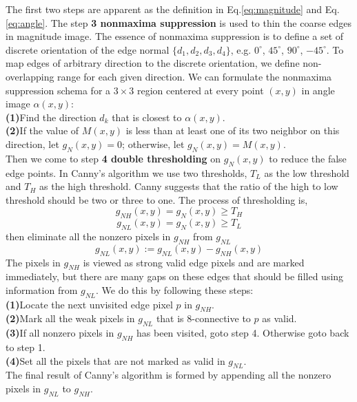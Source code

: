 The first two steps are apparent as the definition in Eq.\ref{eq:magnitude} and Eq.\ref{eq:angle}. The step \textbf{3 nonmaxima suppression} is used to thin the coarse edges in magnitude image. The essence of nonmaxima suppression is to define a set of discrete orientation of the edge normal $\{ d_1, d_2, d_3, d_4 \}$, e.g. $0^\circ$, $45^\circ$, $90^\circ$, $-45^\circ$. To map edges of arbitrary direction to the discrete orientation, we define non-overlapping range for each given direction. We can formulate the nonmaxima suppression schema for a $3\times 3$ region centered at every point $(x,y)$ in angle image $\alpha(x,y)$: \\
\textbf{(1)}Find the direction $d_k$ that is closest to $\alpha(x,y)$. \\
\textbf{(2)}If the value of $M(x,y)$ is less than at least one of its two neighbor on this direction, let $g_N(x,y)=0$; otherwise, let $g_N(x,y)=M(x,y)$. \\
Then we come to step \textbf{4 double thresholding} on $g_N(x,y)$ to reduce the false edge points. In Canny's algorithm we use two thresholds, $T_L$ as the low threshold and $T_H$ as the high threshold. Canny suggests that the ratio of the high to low threshold should be two or three to one. The process of thresholding is, \begin{equation} g_{NH}(x,y)=g_N(x,y)\geq T_H \end{equation}\begin{equation} g_{NL}(x,y)=g_N(x,y)\geq T_L\end{equation} then eliminate all the nonzero pixels in $g_{NH}$ from $g_{NL}$ \begin{equation} g_{NL}(x,y) := g_{NL}(x,y)-g_{NH}(x,y) \end{equation} The pixels in $g_{NH}$ is viewed as strong valid edge pixels and are marked immediately, but there are many gaps on these edges that should be filled using information from $g_{NL}$. We do this by following these steps:\\
\textbf{(1)}Locate the next unvisited edge pixel $p$ in $g_{NH}$. \\
\textbf{(2)}Mark all the weak pixels in $g_{NL}$ that is 8-connective to $p$ as valid. \\
\textbf{(3)}If all nonzero pixels in $g_{NH}$ has been visited, goto step 4. Otherwise goto back to step 1. \\
\textbf{(4)}Set all the pixels that are not marked as valid in $g_{NL}$.\\
The final result of Canny's algorithm is formed by appending all the nonzero pixels in $g_{NL}$ to $g_{NH}$.
